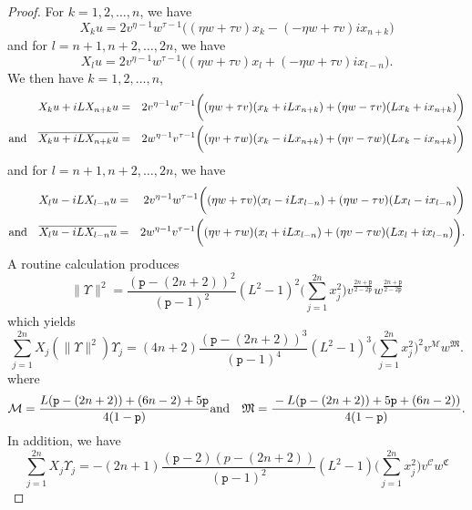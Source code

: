 \documentclass[12pt]{amsart}
\theoremstyle{plain}
\theoremstyle{definition}
\numberwithin{equation}{section}
\begin{document}
\begin{proof}
For $k=1,2,\ldots, n$, we have 
\begin{equation*}
X_ku = 2v^{\eta-1}w^{\tau-1}\big((\eta w+\tau v)x_k-(-\eta w+\tau v)ix_{n+k}\big)
\end{equation*}
and for $l=n+1, n+2, \ldots, 2n$, we have
\begin{equation*}
X_lu  =  2v^{\eta-1}w^{\tau-1}\big((\eta w+\tau v)x_l+(-\eta w+\tau v)ix_{l-n}\big).
\end{equation*}
We then have $k=1,2,\ldots, n$, 
\begin{eqnarray*}
X_ku+iLX_{n+k}u & = & 2v^{\eta-1}w^{\tau-1}\bigg((\eta w+ \tau v)(x_k+iLx_{n+k})+(\eta w- \tau v)(Lx_k+ix_{n+k})\bigg)\\
\textmd{and} \ \ \ \overline{X_ku+iLX_{n+k}u} & = & 2w^{\eta-1}v^{\tau-1}\bigg((\eta v+ \tau w)(x_k-iLx_{n+k}) +(\eta v- \tau w)(Lx_k-ix_{n+k})\bigg)
\end{eqnarray*}
and for $l=n+1, n+2, \ldots, 2n$, we have
\begin{eqnarray*}
X_lu-iLX_{l-n}u & = & 2v^{\eta-1}w^{\tau-1}\bigg((\eta w+ \tau v)(x_l-iLx_{l-n})+(\eta w- \tau v)(Lx_{l}-ix_{l-n})\bigg)\\
\textmd{and} \ \ \ \overline{X_lu-iLX_{l-n}u} & = & 2w^{\eta-1}v^{\tau-1}\bigg((\eta v+ \tau w)(x_l+iLx_{l-n})+(\eta v- \tau w)(Lx_{l}+ix_{l-n})\bigg).
\end{eqnarray*}
A routine calculation produces
\begin{equation}\label{normval}
\| \Upsilon\|^{2}
= \frac{ ({\texttt{p}}-(2n+2))^2 }{({\texttt{p}}-1)^2}( L^2-1)^2\Big(\sum_{j=1}^{2n}x_j^2 \Big)v^{\frac{2n+ {\texttt{p}}}{2 - 2 {\texttt{p}}}}w^{\frac{2n+ {\texttt{p}}}{2 - 2 {\texttt{p}}}}
\end{equation}
which yields 
\begin{equation}\label{part1}
\sum_{j=1}^{2n}X_j(\| \Upsilon\|^{2})\Upsilon_j =
(4n+2) \frac{({\texttt{p}}-(2n+2))^3}{({\texttt{p}}-1)^4}(L^2-1)^3\Big(\sum_{j=1}^{2n}x_j^2 \Big)^2 v^{\mathcal{M}}w^{\mathfrak{M}}.
\end{equation}
where 
\begin{eqnarray*}
\mathcal{M}=\frac{{\displaystyle} L({\texttt{p}}-(2n+2)) + (6n-2) + 5{\texttt{p}}}{{\displaystyle} 4(1-{\texttt{p}})}& \textmd{and} &
\mathfrak{M}=\frac{{\displaystyle} -L({\texttt{p}}-(2n+2))+5{\texttt{p}}+(6n-2))}{{\displaystyle} 4(1-{\texttt{p}})}.
\end{eqnarray*}
In addition, we have 
\begin{equation}\label{part2}
\sum_{j=1}^{2n}X_j\Upsilon_j = -(2n+1)\frac{({\texttt{p}}-2)(p-(2n+2))}{({\texttt{p}}-1)^2}(L^2-1)\Big(\sum_{j=1}^{2n}x_j^2\Big) v^{\mathcal{C}}w^{\mathfrak{C}}

\end{equation}
\end{proof}
\end{document}
